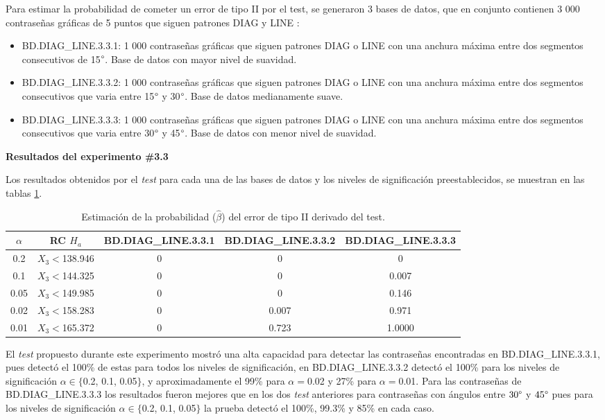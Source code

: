 \documentclass[12pt]{report}
\begin{document}
Para estimar la probabilidad de cometer un error de tipo II por el test, se generaron 3 bases de datos, que en conjunto contienen 3 000 contraseñas gráficas de 5 puntos que siguen patrones DIAG y LINE :
\begin{itemize}
	\item BD.DIAG\_LINE.3.3.1: 1 000 contraseñas gráficas que siguen patrones DIAG o LINE con una anchura máxima entre dos segmentos consecutivos de 15$\degree$. Base de datos con mayor nivel de suavidad. 
	\item BD.DIAG\_LINE.3.3.2: 1 000 contraseñas gráficas que siguen patrones DIAG o LINE con una anchura máxima entre dos segmentos consecutivos que varia entre 15$\degree$ y 30$\degree$. Base de datos medianamente suave.
	\item BD.DIAG\_LINE.3.3.3: 1 000 contraseñas gráficas que siguen patrones DIAG o LINE con una anchura máxima entre dos segmentos consecutivos que varia entre 30$\degree$ y 45$\degree$. Base de datos con menor nivel de suavidad.
\end{itemize}
\textbf{Resultados del experimento \#3.3}

Los resultados obtenidos por el \textit{test}  para cada una de las bases de datos y los  niveles de significación preestablecidos, se muestran en las tablas \ref{tab3:error2-prob1}.

\begin{table}[h!]
	\centering
	\begin{tabular}{|c|c|ccc|}
		\hline
		$\alpha$&RC $H_a$ &BD.DIAG\_LINE.3.3.1 & BD.DIAG\_LINE.3.3.2 & BD.DIAG\_LINE.3.3.3  \\
		\hline
		0.2 & $X_3<$138.946  &0     & 0          & 0     \\
		0.1 & $X_3<$144.325 &0     & 0          & 0.007     \\
		0.05 &$X_3<$149.985 &0     & 0   		& 0.146     \\
		0.02 &$X_3<$158.283 &0     & 0.007   & 0.971     \\
		0.01 &$X_3<$165.372 &0     & 0.723    & 1.0000     \\
		\hline
	\end{tabular}
	\caption{Estimación de la probabilidad ($\hat{\beta}$) del error de tipo II derivado del test.}
	\label{tab3:error2-prob1}
\end{table}
El \textit{test} propuesto durante este experimento mostró una alta capacidad para detectar las contraseñas encontradas en BD.DIAG\_LINE.3.3.1, pues detectó el 100\% de estas para todos los niveles de significación, en BD.DIAG\_LINE.3.3.2 detectó el 100\% para los niveles de significación $\alpha \in \{$0.2, 0.1, 0.05$\}$, y aproximadamente el 99\% para $\alpha=$0.02 y 27\% para $\alpha=$0.01. Para las contraseñas de BD.DIAG\_LINE.3.3.3 los resultados fueron mejores que en los dos \textit{test} anteriores para contraseñas con ángulos entre $30\degree$ y $45\degree$  pues para los niveles de significación $\alpha \in \{$0.2, 0.1, 0.05$\}$ la prueba detectó el 100\%, 99.3\% y 85\% en cada caso.
\end{document}
